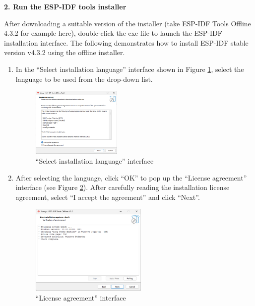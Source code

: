 \documentclass[a4paper,12pt,openany]{book}
\begin{document}
\textbf{2. Run the ESP-IDF tools installer}

After downloading a suitable version of the installer (take ESP-IDF Tools Offline 4.3.2 for example here), double-click the exe file to launch the ESP-IDF installation interface. The following demonstrates how to install ESP-IDF stable version v4.3.2 using the offline installer.

\begin{enumerate}[label=(\arabic*)]
    \item In the “Select installation language” interface shown in Figure \ref{“Select installation language” interface}, select the language to be used from the drop-down list.

    \begin{figure}[h!]
        \centering
        \includegraphics[width=0.41\textwidth]{D4Z/4-5}
        \caption{“Select installation language” interface}
        \label{“Select installation language” interface}
    \end{figure}

    \item After selecting the language, click “OK” to pop up the “License agreement” interface (see Figure \ref{“License agreement” interface}). After carefully reading the installation license agreement, select “I accept the agreement” and click “Next”.

    \begin{figure}[h!]
        \centering
        \includegraphics[width=0.53\textwidth]{D4Z/4-6}
        \caption{“License agreement” interface}
        \label{“License agreement” interface}
    \end{figure}


\end{enumerate}
\end{document}

